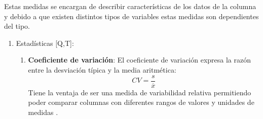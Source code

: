 \documentclass[a4paper,10pt,twocolumn]{article}
\begin{document}
			Estas medidas se encargan de describir caracter\'isticas 
			de los datos de la columna 
			y debido a que existen distintos tipos de variables estas medidas son dependientes del tipo.
			\begin{enumerate}
				\item Estad\'isticas [Q,T]:
					\begin{enumerate}
						\item \textbf{Coeficiente de variaci\'on}: El coeficiente de variaci\'on expresa la raz\'on entre la desviaci\'on t\'ipica
						y la media aritm\'etica: $$CV = \frac{s}{\overline{x}}$$ Tiene la ventaja de ser una medida de variabilidad relativa permitiendo poder
						comparar columnas con diferentes rangos de valores y unidades de medidas \cite{mann2007introductory_cv}.

\end{enumerate}
\end{enumerate}
\end{document}
